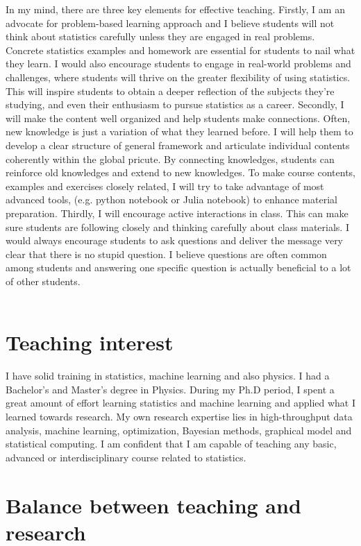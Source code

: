 \documentclass[12pt]{amsart} \usepackage{amssymb}
\begin{document}
In my mind, there are three key elements for effective teaching.
Firstly, I am an advocate for problem-based learning approach and 
I believe students will not think about statistics carefully unless they are engaged in real problems.
Concrete statistics examples and homework are essential for students to nail what they learn.
I would also encourage students to engage in real-world problems and challenges,
where students will thrive on the greater flexibility of using statistics.
This will inspire students to obtain a deeper reflection of the subjects they're studying,
and even their enthusiasm to pursue statistics as a career. 
Secondly, I will make the content well organized and help students make connections.
Often, new knowledge is just a variation of what they learned before.
I will help them to develop a clear structure of general framework and 
articulate  individual contents coherently within the global pricute.
By connecting knowledges,
students can reinforce old knowledges and extend to new knowledges.
To make course contents, examples and exercises closely related,
I will try to take advantage of most advanced tools, (e.g. python notebook or Julia notebook) to enhance material preparation.
Thirdly, I will encourage active interactions in class.
This can make sure students are following closely and thinking carefully about class materials.
I would always encourage students to ask questions and deliver the message very clear that there is no stupid question. 
I believe questions are often common among students and
answering one specific question is actually beneficial to a lot of other students.
\\
\\

\section{Teaching interest}
I have solid training in statistics, machine learning and also physics.
I had a Bachelor's and Master's degree in Physics.
During my Ph.D period,
I spent a great amount of effort learning statistics and machine learning and applied what I learned towards research.
My own research expertise lies in high-throughput data analysis, machine learning, optimization, Bayesian methods, graphical model and statistical computing.
I am confident that I am capable of teaching any basic, advanced or interdisciplinary course related to statistics.

\section{Balance between teaching and research}
\end{document}
